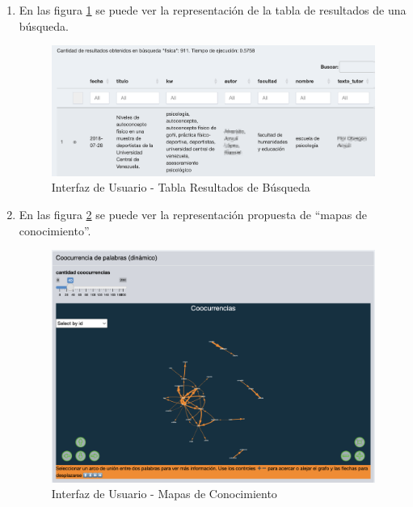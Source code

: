\documentclass[
  12pt,
  openany]{book}
\begin{document}
\begin{enumerate}
  \begin{enumerate}
  \def\labelenumii{\arabic{enumii}.}
  \item
    En las figura \ref{fig:tablaresultados2} se puede ver la representación de la tabla de resultados de una búsqueda.

    \begin{figure}

    {\centering \includegraphics[width=0.9\linewidth]{images/05-desarrollo/4_ciclo/UI/tablaresultado} 

    }

    \caption{Interfaz de Usuario - Tabla Resultados de Búsqueda}\label{fig:tablaresultados2}
    \end{figure}
  \item
    En las figura \ref{fig:tablaresultados3} se puede ver la representación propuesta de ``mapas de conocimiento''.

    \begin{figure}

    {\centering \includegraphics[width=0.7\linewidth]{images/05-desarrollo/4_ciclo/UI/uimapas} 

    }

    \caption{Interfaz de Usuario - Mapas de Conocimiento}\label{fig:tablaresultados3}
    \end{figure}
  \end{enumerate}
\end{enumerate}
\end{document}
